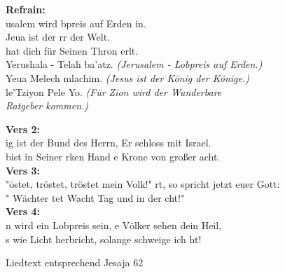 \begin{tabbing}
\textbf{Refrain:}\\
usalem wird  bpreis auf Erden in. \\
Jeua ist der rr der Welt.\\ 
 hat dich für Seinen Thron erlt.\\
Yerushala - Telah ba'atz. \hspace{30px} \= \textit{(Jerusalem - Lobpreis auf Erden.)}\\
Yeua Melech mlachim. \>	\textit{(Jesus ist der König der Könige.)}\\
 le'Tziyon Pele Yo. \>	\textit{(Für Zion wird der Wunderbare}\\
\> \textit{Ratgeber kommen.)}
\end{tabbing} 

\textbf{Vers 2:}\\
ig ist der Bund des Herrn,  Er schloss mit Israel.\\
 bist in Seiner rken Hand e Krone von großer acht.\\

\textbf{Vers 3:}\\
"östet, tröstet, tröstet mein Volk!" rt, so spricht jetzt euer Gott:\\
" Wächter tet Wacht  Tag und in der cht!"\\

\textbf{Vers 4:}\\
n wird ein Lobpreis sein, e Völker sehen dein Heil,\\
s wie Licht herbricht,  solange schweige ich ht! \\

\begin{footnotesize}
Liedtext entsprechend Jesaja 62
\end{footnotesize}